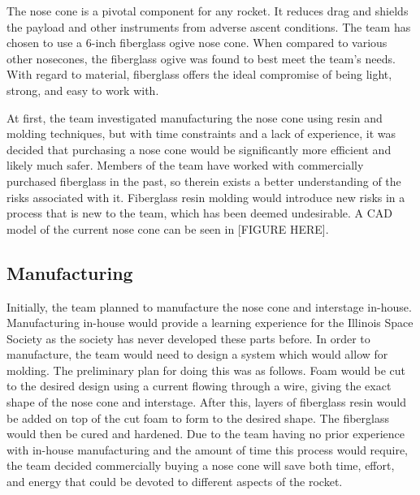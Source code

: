 The nose cone is a pivotal component for any rocket. It reduces drag and shields the payload and other instruments from adverse ascent conditions. The team has chosen to use a 6-inch fiberglass ogive nose cone. When compared to various other nosecones, the fiberglass ogive was found to best meet the team’s needs. With regard to material, fiberglass offers the ideal compromise of being light, strong, and easy to work with.

At first, the team investigated manufacturing the nose cone using resin and molding techniques, but with time constraints and a lack of experience, it was decided that purchasing a nose cone would be significantly more efficient and likely much safer. Members of the team have worked with commercially purchased fiberglass in the past, so therein exists a better understanding of the risks associated with it. Fiberglass resin molding would introduce new risks in a process that is new to the team, which has been deemed undesirable. A CAD model of the current nose cone can be seen in [FIGURE HERE].



    \subsection{Manufacturing}
    Initially, the team planned to manufacture the nose cone and interstage in-house. Manufacturing in-house would provide a learning experience for the Illinois Space Society as the society has never developed these parts before. In order to manufacture, the team would need to design a system which would allow for molding. The preliminary plan for doing this was as follows. Foam would be cut to the desired design using a current flowing through a wire, giving the exact shape of the nose cone and interstage. After this, layers of fiberglass resin would be added on top of the cut foam to form to the desired shape. The fiberglass would then be cured and hardened. Due to the team having no prior experience with in-house manufacturing and the amount of time this process would require, the team decided commercially buying a nose cone will save both time, effort, and energy that could be devoted to different aspects of the rocket.
    
